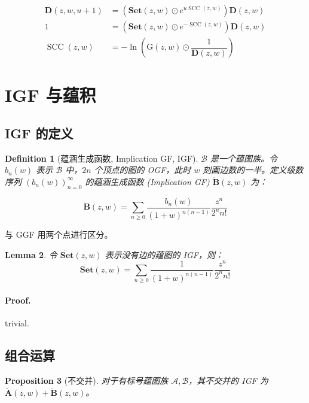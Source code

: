\documentclass[10pt,a4paper,oneside]{article}
\newtheorem{definition}{Definition}[section]
\newtheorem{lemma}[definition]{Lemma}
\newtheorem{proposition}[definition]{Proposition}
\begin{document}
\[
\begin{aligned}
\mathbf{D}(z,w,u+1) &= \left(\mathbf{Set}(z,w) \odot e^{u \operatorname{SCC}(z,w)}\right) \mathbf D(z,w)\\
1 &= \left(\mathbf{Set}(z,w) \odot e^{- \operatorname{SCC}(z,w)}\right) \mathbf D(z,w)\\
\operatorname{SCC}(z,w) &= -\ln\left(\mathrm G(z,w) \odot \dfrac{1}{\mathbf D(z,w)}\right)
\end{aligned}
\]


\section{IGF 与蕴积}

\subsection{IGF 的定义}

\begin{definition}[蕴涵生成函数, Implication GF, IGF]
    $\mathcal{B}$ 是一个蕴图族。令 $b_n(w)$ 表示 $\mathcal{B}$ 中，$2n$ 个顶点的图的 OGF，此时 $w$ 刻画边数的一半。定义级数序列 $(b_n(w))_{n=0}^{\infty}$ 的蕴涵生成函数 (Implication GF) $\ddot{\mathbf{B}}(z,w)$ 为：

    \[\ddot{\mathbf{B}}(z,w) = \sum_{n\ge 0} \dfrac{b_n(w)}{(1+w)^{n(n-1)}}\dfrac{z^n}{2^nn!}\]
\end{definition}

与 GGF 用两个点进行区分。

\begin{lemma}
    令 $\ddot{\mathbf{Set}}(z,w)$ 表示没有边的蕴图的 IGF，则：
    \[\ddot{\mathbf{Set}}(z,w) = \sum_{n\ge 0} \dfrac{1}{(1+w)^{n(n-1)}}\dfrac{z^n}{2^nn!}\]
\end{lemma}

\paragraph{Proof.} trivial.

\subsection{组合运算}

\begin{proposition}[不交并]
    对于有标号蕴图族 $\mathcal{A},\mathcal{B}$，其不交并的 IGF 为 $\ddot{\mathbf{A}}(z,w)+\ddot{\mathbf{B}}(z,w)$。
\end{proposition}
\end{document}
